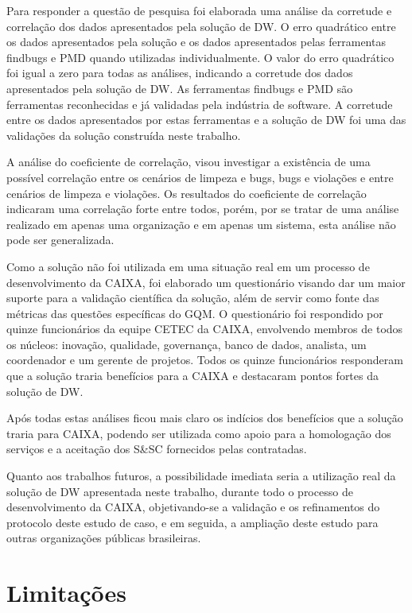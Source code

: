 Para responder a questão de pesquisa foi elaborada uma análise da corretude e correlação dos dados apresentados pela solução de DW. O erro quadrático entre os dados apresentados pela solução e os dados apresentados pelas ferramentas findbugs e PMD quando utilizadas individualmente. O valor do erro quadrático foi igual a zero para todas as análises, indicando a corretude dos dados apresentados pela solução de DW. As ferramentas findbugs e PMD são ferramentas reconhecidas e já validadas pela indústria de software. A corretude entre os dados apresentados por estas ferramentas e a solução de DW foi uma das validações da solução construída neste trabalho.

A análise do coeficiente de correlação, visou investigar a existência de uma possível correlação entre os cenários de limpeza e bugs, bugs e violações e entre cenários de limpeza e violações. Os resultados do coeficiente de correlação indicaram uma correlação forte entre todos, porém, por se tratar de uma análise realizado em apenas uma organização e em apenas um sistema, esta análise não pode ser generalizada.

Como a solução não foi utilizada em uma situação real em um processo de desenvolvimento da CAIXA, foi elaborado um questionário visando dar um maior suporte para a validação científica da solução, além de servir como fonte das métricas das questões específicas do GQM. O questionário foi respondido por quinze funcionários da equipe CETEC da CAIXA, envolvendo membros de todos os núcleos: inovação, qualidade, governança, banco de dados, analista, um coordenador e um gerente de projetos. Todos os quinze funcionários responderam que a solução traria benefícios para a CAIXA e destacaram pontos fortes da solução de DW.  

Após todas estas análises ficou mais claro os indícios dos benefícios que a solução traria para CAIXA, podendo ser utilizada como apoio para a homologação dos serviços e a aceitação dos S\&SC fornecidos pelas contratadas.  

Quanto aos trabalhos futuros, a possibilidade imediata seria a utilização real da solução de DW apresentada neste trabalho, durante todo o processo de desenvolvimento da CAIXA, objetivando-se a validação e os refinamentos do protocolo deste estudo de caso, e em seguida, a ampliação deste estudo para outras organizações públicas brasileiras.  

\section{Limitações}


